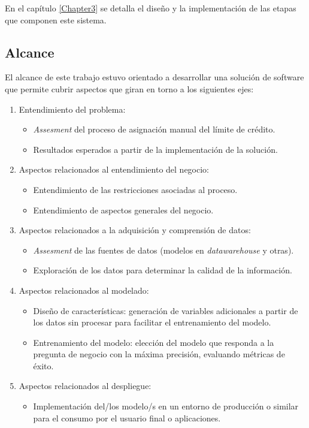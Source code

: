 \vspace{1cm}

En el capítulo \ref{Chapter3} se detalla el diseño y la implementación de las etapas que componen este sistema.

	
\subsection{Alcance}


El alcance de este trabajo estuvo orientado a desarrollar una solución de software que permite cubrir aspectos que giran en torno a los siguientes ejes:

\begin {enumerate}
\item Entendimiento del problema: 
	\begin {itemize}
	\item \textit{Assesment} del proceso de asignación manual del límite de
crédito. 
	\item Resultados esperados a partir de la implementación de la solución.
	\end {itemize}

	
\item Aspectos relacionados al entendimiento del negocio: 
	\begin {itemize}
	\item Entendimiento de las restricciones asociadas al proceso. 
	\item Entendimiento de aspectos generales del negocio.
	\end {itemize}
	
\item Aspectos relacionados a la adquisición y comprensión de datos: 
	\begin {itemize}
	\item \textit{Assesment} de las fuentes de datos (modelos en \textit{datawarehouse} y otras). 
	\item Exploración de los datos para determinar la calidad de la información.
	\end {itemize}
	
\item Aspectos relacionados al modelado: 
	\begin {itemize}
	\item Diseño de características: generación de variables adicionales a partir de los datos sin procesar para facilitar 
el entrenamiento del modelo.
	\item Entrenamiento del modelo: elección del modelo que responda a la pregunta de negocio con la máxima precisión, evaluando métricas de éxito.
	\end {itemize}
	
\item Aspectos relacionados al despliegue: 
	\begin {itemize}
	\item Implementación del/los modelo/s en un entorno de producción o similar para el consumo por el usuario final o aplicaciones. 
	\end {itemize}
\end {enumerate}
 
